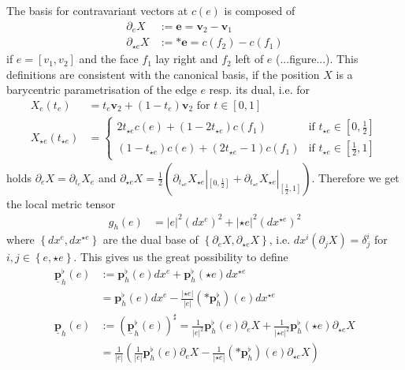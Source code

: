 \documentclass{scrartcl}
\newcommand{\pflh}{\mathbf{p}^{\flat}_{h}}
\newcommand{\PDpflh}{\underline{\mathbf{p}}^{\flat}_{h}}
\newcommand{\PDph}{\underline{\mathbf{p}}_{h}}
\newcommand{\e}{\mathbf{e}}
\renewcommand{\v}{\mathbf{v}}
\begin{document}
    The basis for contravariant vectors at \( c(e) \) is composed of
    \begin{align}
      \partial_{e}X &:= \e = \v_{2} - \v_{1} \\
      \partial_{\star e}X &:= *\e =  c(f_{2}) - c(f_{1})
    \end{align}
    if \( e=\left[ v_{1}, v_{2} \right] \) and the face \( f_{1} \) lay right and \( f_{2} \) left of \( e \) (...figure...). 
    This definitions are consistent with the canonical basis, if the position \( X \) is a barycentric parametrisation of the edge \( e \)
    resp. its dual, i.e. for
    \begin{align}
      X_{e}(t_{e}) &= t_{e}\v_{2} + \left( 1 - t_{e} \right)\v_{2} \text{ for } t\in[0,1]\\
      X_{\star e}(t_{\star e}) &=\begin{cases}
                        2t_{\star e}c(e) + \left( 1 - 2t_{\star e} \right) c(f_{1}) & \text{if } t_{\star e}\in\left[ 0 , \frac{1}{2} \right] \\
                        \left(1 - t_{\star e}\right) c(e) + \left( 2t_{\star e} - 1 \right) c(f_{1}) 
                                & \text{if } t_{\star e}\in \left[\frac{1}{2} , 1\right]
                      \end{cases}
    \end{align}
    holds \( \partial_{e}X = \partial_{t_{e}}X_{e} \) 
    and \( \partial_{\star e}X = \frac{1}{2} \left( \partial_{t_{\star e}}X_{\star e}|_{\left[ 0 , \frac{1}{2} \right]} 
                                                   + \partial_{t_{\star e}}X_{\star e}|_{\left[\frac{1}{2}, 1 \right]}\right) \).
    Therefore we get the local metric tensor
    \begin{align}
      g_h(e) &= \left| e \right|^{2} \left( dx^{e} \right)^{2} + \left| \star e \right|^{2} \left( dx^{\star e} \right)^{2}
    \end{align}
    where \( \left\{  dx^{e}, dx^{\star e} \right\} \) are the dual base of \( \left\{ \partial_{e}X, \partial_{\star e}X \right\} \),
    i.e. \( dx^{i}\left(\partial_{j}X\right) = \delta^{i}_{j} \) for \( i,j\in\left\{ e, \star e \right\} \).
    This gives us the great possibility to define
    \begin{align}
      \PDpflh(e) &:= \pflh(e)dx^{e} + \pflh(\star e)  dx^{\star e} \\
                   &= \pflh(e)dx^{e} - \frac{\left| \star e \right|}{\left| e \right|} \left(*\pflh\right)(e)  dx^{\star e} \\
      \PDph(e) &:= \left(\PDpflh(e)\right)^{\sharp} 
                 = \frac{1}{\left| e \right|^{2}} \pflh(e)\partial_{e}X + \frac{1}{\left|\star e \right|^{2}} \pflh(\star e)\partial_{\star e}X \\
               & =  \frac{1}{\left| e \right|} \left( \frac{1}{\left| e \right|} \pflh(e)\partial_{e}X 
                                                     -\frac{1}{\left|\star e \right|} \left(*\pflh\right)(e) \partial_{\star e}X\right)
    \end{align}
\end{document}
